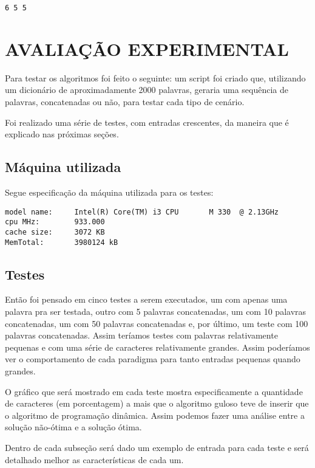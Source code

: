 \documentclass[12pt]{article}
\begin{document}
\begin{verbatim}
6 5 5
\end{verbatim}


\section{AVALIAÇÃO EXPERIMENTAL}
\label{avaliacao_experimental}

Para testar os algoritmos foi feito o seguinte: um script foi criado que, utilizando um dicionário de aproximadamente 2000 palavras, geraria uma sequência de palavras, concatenadas ou não, para testar cada tipo de cenário.

Foi realizado uma série de testes, com entradas crescentes, da maneira que é explicado nas próximas seções.

\subsection{Máquina utilizada}
\label{maquina}

Segue especificação da máquina utilizada para os testes:
\begin{verbatim}
model name:     Intel(R) Core(TM) i3 CPU       M 330  @ 2.13GHz
cpu MHz:        933.000
cache size:     3072 KB
MemTotal:       3980124 kB
\end{verbatim}


\subsection{Testes}
\label{testes}

Então foi pensado em cinco testes a serem executados, um com apenas uma palavra pra ser testada, outro com 5 palavras concatenadas, um com 10 palavras concatenadas, um com 50 palavras concatenadas e, por último, um teste com 100 palavras concatenadas. Assim teríamos testes com palavras relativamente pequenas e com uma série de caracteres relativamente grandes. Assim poderíamos ver o comportamento de cada paradigma para tanto entradas pequenas quando grandes.

O gráfico que será mostrado em cada teste mostra especificamente a quantidade de caracteres (em porcentagem) a mais que o algoritmo guloso teve de inserir que o algoritmo de programação dinâmica. Assim podemos fazer uma análise entre a solução não-ótima e a solução ótima.

Dentro de cada subseção será dado um exemplo de entrada para cada teste e será detalhado melhor as características de cada um.
\end{document}
